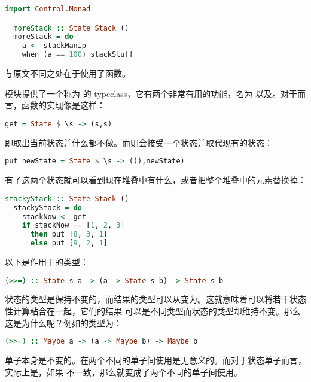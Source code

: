 \documentclass[./main.tex]{subfiles}
\begin{document}
\begin{lstlisting}[language=Haskell]
  import Control.Monad

  moreStack :: State Stack ()
  moreStack = do
    a <- stackManip
    when (a == 100) stackStuff
\end{lstlisting}

与原文不同之处在于使用了函数。

模块提供了一个称为 的 typeclass，它有两个非常有用的功能，名为
以及。对于而言，函数的实现像是这样：

\begin{lstlisting}[language=Haskell]
  get = State $ \s -> (s,s)
\end{lstlisting}

即取出当前状态并什么都不做。而则会接受一个状态并取代现有的状态：

\begin{lstlisting}[language=Haskell]
  put newState = State $ \s -> ((),newState)
\end{lstlisting}

有了这两个状态就可以看到现在堆叠中有什么，或者把整个堆叠中的元素替换掉：

\begin{lstlisting}[language=Haskell]
  stackyStack :: State Stack ()
  stackyStack = do
    stackNow <- get
    if stackNow == [1, 2, 3]
      then put [8, 3, 1]
      else put [9, 2, 1]
\end{lstlisting}

以下是作用于的\acode{>>=}类型：

\begin{lstlisting}[language=Haskell]
  (>>=) :: State s a -> (a -> State s b) -> State s b
\end{lstlisting}

状态的类型是保持不变的，而结果的类型可以从变为。这就意味着可以将若干状态性计算粘合在一起，它们的结果
可以是不同类型而状态的类型却维持不变。那么这是为什么呢？例如的\acode{>>=}类型为：

\begin{lstlisting}[language=Haskell]
  (>>=) :: Maybe a -> (a -> Maybe b) -> Maybe b
\end{lstlisting}

单子本身是不变的。在两个不同的单子间使用\acode{>>=}是无意义的。而对于状态单子而言，实际上是，如果
不一致，那么就变成了两个不同的单子间使用\acode{>>=}。
\end{document}
